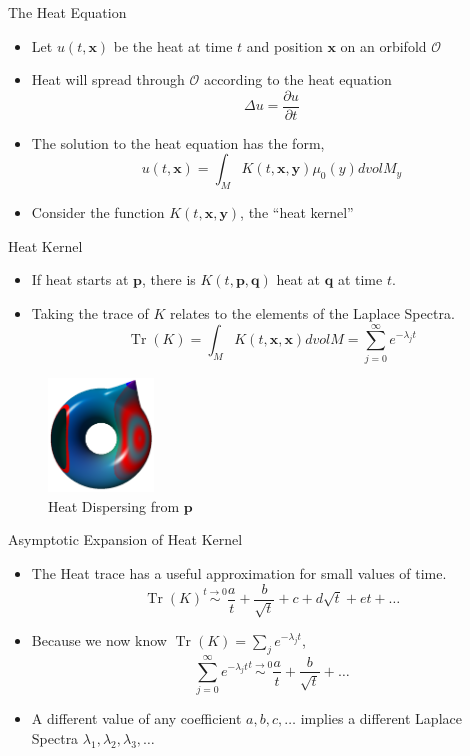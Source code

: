 \documentclass[12pt]{beamer}
\newcommand{\pder}[2]{\frac{\partial#1}{\partial#2}}
\DeclareMathOperator{\tr}{Tr}
\begin{document}
\begin{frame}{The Heat Equation}
    \begin{itemize}
    \item Let $u(t,\mathbf{x})$ be the heat at time $t$ and position
        $\mathbf{x}$ on an
        orbifold $\mathcal{O}$
    \item Heat will spread through $\mathcal{O}$ according to the heat
        equation
        $$\Delta u = \pder{u}{t}$$
    \item The solution to the heat equation has the form,
        $$u(t,\mathbf{x}) =
        \int_{M}K(t,\mathbf{x},\mathbf{y})\mu_0(y)dvolM_y$$
    \item Consider the function $K(t,\mathbf{x},\mathbf{y})$, the ``heat
        kernel''
    \end{itemize}
\end{frame}

\begin{frame}{Heat Kernel}
    \begin{itemize}
        \item If heat starts at $\mathbf{p}$, there is
            $K(t,\mathbf{p},\mathbf{q})$ heat at $\mathbf{q}$ at time $t$.
    \item Taking the trace of $K$ relates to the elements of the Laplace
        Spectra.
        $$\tr(K) = \int_{M}K(t,\mathbf{x},\mathbf{x})dvolM =
        \sum_{j=0}^{\infty} e^{-\lambda_j t}$$
    \end{itemize}
    \begin{figure}
        \includegraphics[width=0.25\textwidth]{images/heat_ex.png}
        \caption{Heat Dispersing from $\mathbf{p}$}
    \end{figure}
\end{frame}

\begin{frame}{Asymptotic Expansion of Heat Kernel}
    \begin{itemize}
    \item The Heat trace has a useful approximation for small values
        of time.
        $$\tr(K) \stackrel{t \to 0}{\sim}
        \frac{a}{t} + \frac{b}{\sqrt{t}} + c + d\sqrt{t} + et + \dots$$
    \item Because we now know $\tr(K) = \sum_{j} e^{-\lambda_j t}$,
        $$\sum_{j=0}^{\infty} e^{-\lambda_j t} \stackrel{t \to 0}{\sim} 
        \frac{a}{t} + \frac{b}{\sqrt{t}} + \dots$$
    \item A different value of any coefficient $a,b,c,\dots$ implies a
        different Laplace Spectra $\lambda_1, \lambda_2, \lambda_3, \dots$
    \end{itemize}
\end{frame}
\end{document}
